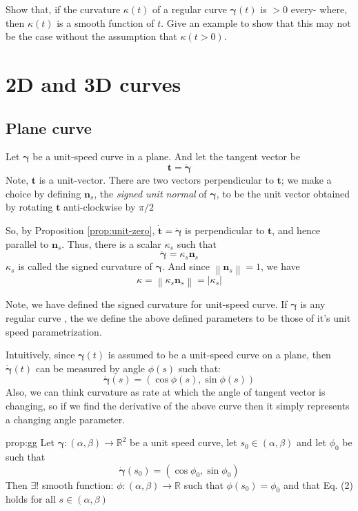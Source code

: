 \documentclass{notes}
\newcommand{\norm}[1]{\left\lVert #1 \right \rVert}
\newcommand{\abs}[1]{\left| #1 \right|}
\begin{document}
\begin{problem}
	Show that, if the curvature \(\kappa(t)\) of a regular curve \(\bm{\gamma}(t) \) is \(>0\) every-
	where, then \(\kappa(t)\) is a smooth function of \(t\). Give an example to show
	that this may not be the case without the assumption that \(\kappa(t >0)\).
\end{problem}

\section{2D and 3D curves}
\subsection{Plane curve}
Let \(\bm{\gamma}\) be a unit-speed curve in a plane. And let the tangent vector be
\[\mathbf{t} = \dot{\bm{\gamma}}\]
Note, \(\mathbf{t}\) is a unit-vector. There are two vectors perpendicular to \(\mathbf{t}\);  we make a choice by defining \(\mathbf{n}_s\), the \textit{signed unit normal} of \(\bm{\gamma}\), to be the unit vector obtained by rotating \(\mathbf{t}\) anti-clockwise by \(\pi/2 \)

So, by Proposition \ref{prop:unit-zero}, \(\dot{\mathbf{t}} = \ddot{\bm{\gamma}}\) is perpendicular to \(\mathbf{t}\), and hence parallel to \(\mathbf{n}_s\). Thus, there is a scalar \(\kappa_s\) such that
\[\ddot{\bm{\gamma}}= \kappa_s \mathbf{n}_s\]
\(\kappa_s\) is called the signed curvature of \(\bm{\gamma}\). And since \(\norm{\mathbf{n}_s} = 1\), we have
\[\kappa = \norm{\kappa_s \mathbf{n}_s} = \abs{\kappa_s}\]

Note, we have defined the signed curvature for unit-speed curve. If \(\bm{\gamma}\) is any regular curve , the we define the above defined parameters to be those of it's unit speed parametrization. 


Intuitively, since \(\bm{\gamma}(t)\) is assumed to be a unit-speed curve on a plane, then \(\dot{\bm{\gamma}}(t)\) can be measured by angle \(\phi(s)\) such that:
\[\dot{\bm{\gamma}}(s) = (\cos \phi (s), \sin \phi(s)) \tag*{(2)}\]
Also, we can think curvature as rate at which the angle of tangent vector is changing, so if we find the derivative of the above curve then it simply represents a changing angle parameter. 

\begin{proposition}{prop:gg}
	Let \(\bm{\gamma}: (\alpha, \beta) \to \mathbb{R}^2\) be a unit speed curve, let \(s_0 \in (\alpha, \beta)\) and let \(\phi _0 \) be such that 
	\[\dot{\bm{\gamma}}(s_0) = (\cos \phi _0, \sin \phi_0) \]
	Then \(\exists!\) smooth function: \(\phi: (\alpha, \beta) \to \mathbb{R}\) such that \(\phi(s_0) = \phi _ 0\) and that Eq. (2) holds for all \(s \in (\alpha, \beta)\)
\end{proposition}
\end{document}
